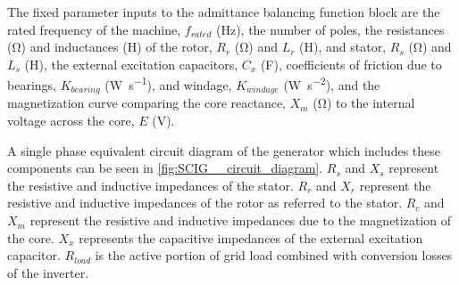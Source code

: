 The fixed parameter inputs to the admittance balancing function block are the rated frequency of the machine, $f_{rated}$ (\si{\hertz}), the number of poles, the resistances (\si{\ohm}) and inductances (\si{\henry}) of the rotor, $R_r$ (\si{\ohm}) and $L_r$ (\si{\henry}), and stator, $R_s$ (\si{\ohm}) and $L_s$ (\si{\henry}), the external excitation capacitors, $C_x$ (\si{\farad}), coefficients of friction due to bearings, $K_{bearing}$ (\si{\watt\per\second}), and windage, $K_{windage}$ (\si{\watt\per\second\squared}), and the magnetization curve comparing the core reactance, $X_m$ (\si{\ohm}) to the internal voltage across the core, $E$ (\si{\volt}). 

A single phase equivalent circuit diagram of the generator which includes these components can be seen in \autoref{fig:SCIG__circuit_diagram}.  $R_s$ and $X_s$ represent the resistive and inductive impedances of the stator. $R_r$ and $X_r$ represent the resistive and inductive impedances of the rotor as referred to the stator. $R_c$ and $X_m$ represent the resistive and inductive impedances due to the magnetization of the core. $X_x$ represents the capacitive impedances of the external excitation capacitor. $R_{load}$ is the active portion of grid load combined with conversion losses of the inverter.


